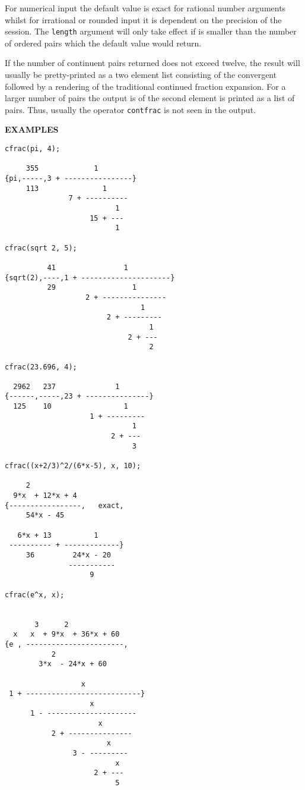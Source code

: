 For numerical input the default value is exact for
rational number arguments whilst for irrational or rounded input it is
dependent on the precision of the session. The
\texttt{length} argument will only take effect if is smaller
than the number of ordered pairs which the default value would return.

If the number of continuent pairs returned does not exceed
twelve, the result will usually be pretty-printed as a two element list
consisting of the convergent followed by a rendering of the traditional
continued fraction expansion. For a larger number of pairs the output is
of the second element is printed as a list of pairs. Thus, usually the
operator \texttt{contfrac} is not seen in the output.

{\large\textbf{EXAMPLES}}
\begin{verbatim}
cfrac(pi, 4);

     355             1
{pi,-----,3 + ----------------}
     113               1
               7 + ----------
                          1
                    15 + ---
                          1

cfrac(sqrt 2, 5);

          41                1
{sqrt(2),----,1 + ---------------------}
          29                  1
                   2 + ---------------
                                1
                        2 + ---------
                                  1
                             2 + ---
                                  2

cfrac(23.696, 4);

  2962   237              1
{------,-----,23 + ---------------}
  125    10                 1
                    1 + ---------
                              1
                         2 + ---
                              3

cfrac((x+2/3)^2/(6*x-5), x, 10);

     2
  9*x  + 12*x + 4
{-----------------,   exact,
     54*x - 45

   6*x + 13          1
 ---------- + -------------}
     36         24*x - 20
               -----------
                    9

cfrac(e^x, x);


       3      2
  x   x  + 9*x  + 36*x + 60
{e , -----------------------,
           2
        3*x  - 24*x + 60

                  x
 1 + ---------------------------}
                    x
      1 - ---------------------
                      x
           2 + ---------------
                        x
                3 - ---------
                          x
                     2 + ---
                          5
\end{verbatim}

